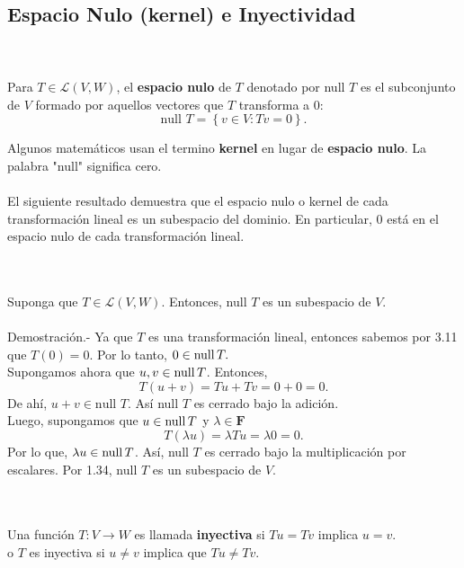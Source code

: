 \;\\
\subsection*{Espacio Nulo (kernel) e Inyectividad}


\begin{mydef}\,\\\\
    Para $T\in \mathcal{L}(V,W)$, el \textbf{espacio nulo} de $T$ denotado por null $T$ es el subconjunto de $V$ formado por aquellos vectores que $T$ transforma a $0$:
    $$\mbox{null } T = \left\{v\in V : Tv=0\right\}.$$
\end{mydef}

Algunos matemáticos usan el termino \textbf{kernel} en lugar de \textbf{espacio nulo}. La palabra "null" significa cero.\\\\

El siguiente resultado demuestra que el espacio nulo o kernel de cada transformación lineal es un subespacio del dominio. En particular, $0$ está en el espacio nulo de cada transformación lineal.

\setcounter{myteo}{13}
\begin{myteo}\,\\\\
    Suponga que $T\in \mathcal{L}(V,W)$. Entonces, null $T$ es un subespacio de $V$.\\\\
	Demostración.-\; Ya que $T$ es una transformación lineal, entonces sabemos por 3.11 que $T(0)=0$. Por lo tanto, $0\in \operatorname{null} T.$\\
	Supongamos ahora que $u,v\in \operatorname{null} T$. Entonces,
	$$T(u+v)=Tu+Tv=0+0=0.$$
	De ahí, $u+v\in \mbox{null } T$. Así null $T$ es cerrado bajo la adición.\\
	Luego, supongamos que $u\in \operatorname{null} T$ y $\lambda \in \textbf{F}$
	$$T(\lambda u)=\lambda T u=\lambda 0 = 0.$$
	Por lo que, $\lambda u \in \operatorname{null} T$. Así, null $T$ es cerrado bajo la multiplicación por escalares. Por 1.34, null $T$ es un subespacio de $V.$
\end{myteo}

\begin{mydef}[Inyectiva]\,\\\\
    Una función $T:V\to W$ es llamada \textbf{inyectiva} si $Tu=Tv$ implica $u=v$.\\

    o $T$ es inyectiva si $u\neq v$ implica que $Tu\neq Tv$.\\\\
\end{mydef}

